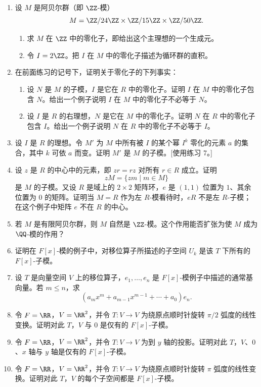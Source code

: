 \begin{enumerate}[label=\arabic*.]
	\[
	\{m\in M\mid am=0\text{ 对所有 }a\in I\}.
	\]
	证明它是 $M$ 的子模。
	\item 设 $M$ 是阿贝尔群（即 $\ZZ$-模）
	\[
	M=\ZZ/24\ZZ\times \ZZ/15\ZZ\times \ZZ/50\ZZ.
	\]
	\begin{enumerate}[label=(\alph*)]
		\item 求 $M$ 在 $\ZZ$ 中的零化子，即给出这个主理想的一个生成元。
		\item 令 $I=2\ZZ$。把 $I$ 在 $M$ 中的零化子描述为循环群的直积。
	\end{enumerate}
	\item 在前面练习的记号下，证明关于零化子的下列事实：
	\begin{enumerate}[label=(\alph*)]
		\item 设 $N$ 是 $M$ 的子模，$I$ 是它在 $R$ 中的零化子。证明 $I$ 在 $M$ 中的零化子包含 $N$。给出一个例子说明 $I$ 在 $M$ 中的零化子不必等于 $N$。
		\item 设 $I$ 是 $R$ 的右理想，$N$ 是它在 $M$ 中的零化子。证明 $N$ 在 $R$ 中的零化子包含 $I$。给出一个例子说明 $N$ 在 $R$ 中的零化子不必等于 $I$。
	\end{enumerate}
	\item 设 $I$ 是 $R$ 的理想。令 $M'$ 为 $M$ 中所有被 $I$ 的某个幂 $I^k$ 零化的元素 $a$ 的集合，其中 $k$ 可依 $a$ 而变。证明 $M'$ 是 $M$ 的子模。[使用练习 7。]
	\item 设 $z$ 是 $R$ 的中心中的元素，即 $zr=rz$ 对所有 $r\in R$ 成立。证明
	\[
	zM=\{zm\mid m\in M\}
	\]
	是 $M$ 的子模。又设 $R$ 是域上的 $2\times2$ 矩阵环，$e$ 是 $(1,1)$ 位置为 $1$、其余位置为 $0$ 的矩阵。证明当 $M=R$ 作为左 $R$-模看待时，$eR$ 不是左 $R$-子模；在这个例子中矩阵 $e$ 不在 $R$ 的中心。
	\item 若 $M$ 是有限阿贝尔群，则 $M$ 自然是 $\ZZ$-模。这个作用能否扩张为使 $M$ 成为 $\QQ$-模的作用？
	\item 证明在 $F[x]$-模的例子中，对移位算子所描述的子空间 $U_k$ 是该 $T$ 下所有的 $F[x]$-子模。
	\item 设 $T$ 是向量空间 $V$ 上的移位算子，$e_1,\ldots,e_n$ 是 $F[x]$-模例子中描述的通常基向量。若 $m\leq n$，求
	\[
	(a_mx^m+a_{m-1}x^{m-1}+\cdots+a_0)e_n.
	\]
	\item 令 $F=\RR$，$V=\RR^2$，并令 $T:V\to V$ 为绕原点顺时针旋转 $\pi/2$ 弧度的线性变换。证明对此 $T$，$V$ 与 $0$ 是仅有的 $F[x]$-子模。
	\item 令 $F=\RR$，$V=\RR^2$，并令 $T:V\to V$ 为到 $y$ 轴的投影。证明对此 $T$，$V$、$0$、$x$ 轴与 $y$ 轴是仅有的 $F[x]$-子模。
	\item 令 $F=\RR$，$V=\RR^2$，并令 $T:V\to V$ 为绕原点顺时针旋转 $\pi$ 弧度的线性变换。证明对此 $T$，$V$ 的每个子空间都是 $F[x]$-子模。

\end{enumerate}
